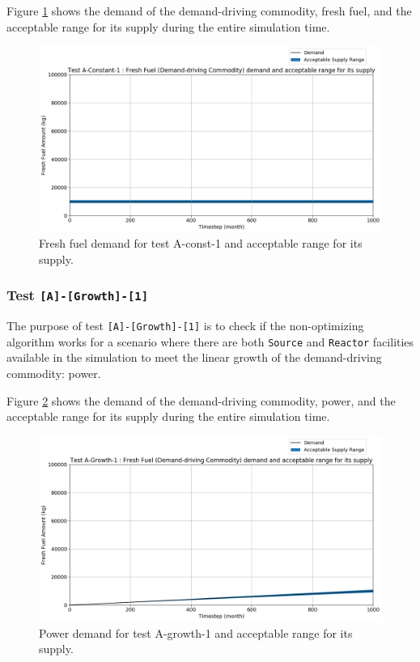 \documentclass[11pt,letterpaper]{article}
\begin{document}
Figure \ref{fig:test-a-constant-1-demand} shows the demand of the demand-driving commodity, fresh fuel, and the acceptable range for its supply during the entire simulation time.  

\begin{figure}[H]
	\begin{center}
		\includegraphics[scale=0.4]{./figures/demand_supply_A-Constant-1.png}
	\end{center}
        \caption{Fresh fuel demand for test A-const-1 and acceptable range for its supply.}
	\label{fig:test-a-constant-1-demand}
\end{figure}

\subsubsection{Test \texttt{[A]-[Growth]-[1]}}
The purpose of test \texttt{[A]-[Growth]-[1]} is to check if the non-optimizing algorithm works for a scenario where there are both \texttt{Source} and \texttt{Reactor} facilities available in the simulation to meet the linear growth of the demand-driving commodity: power. 

Figure \ref{fig:test-a-growth-1-demand} shows the demand of the demand-driving commodity, power, and the acceptable range for its supply during the entire simulation time.  

\begin{figure}[H]
	\begin{center}
		\includegraphics[scale=0.4]{./figures/demand_supply_A-Growth-1.png}
	\end{center}
        \caption{Power demand for test A-growth-1 and acceptable range for its supply.}
	\label{fig:test-a-growth-1-demand}
\end{figure}
\end{document}
